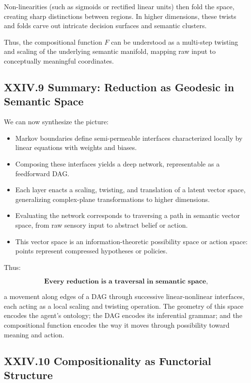 \documentclass[11pt,letterpaper]{article}
\begin{document}
Non-linearities (such as sigmoids or rectified linear units) then fold the space, creating sharp distinctions between regions. In higher dimensions, these twists and folds carve out intricate decision surfaces and semantic clusters.

Thus, the compositional function $F$ can be understood as a multi-step twisting and scaling of the underlying semantic manifold, mapping raw input to conceptually meaningful coordinates.

\subsection{XXIV.9 Summary: Reduction as Geodesic in Semantic Space}

We can now synthesize the picture:

\begin{itemize}
    \item Markov boundaries define semi-permeable interfaces characterized locally by linear equations with weights and biases.
    \item Composing these interfaces yields a deep network, representable as a feedforward DAG.
    \item Each layer enacts a scaling, twisting, and translation of a latent vector space, generalizing complex-plane transformations to higher dimensions.
    \item Evaluating the network corresponds to traversing a path in semantic vector space, from raw sensory input to abstract belief or action.
    \item This vector space is an information-theoretic possibility space or action space: points represent compressed hypotheses or policies.
\end{itemize}

Thus:

\[
\textbf{Every reduction is a traversal in semantic space,} 
\]

a movement along edges of a DAG through successive linear-nonlinear interfaces, each acting as a local scaling and twisting operation. The geometry of this space encodes the agent’s ontology; the DAG encodes its inferential grammar; and the compositional function encodes the way it moves through possibility toward meaning and action.
\subsection{XXIV.10 Compositionality as Functorial Structure}
\end{document}
